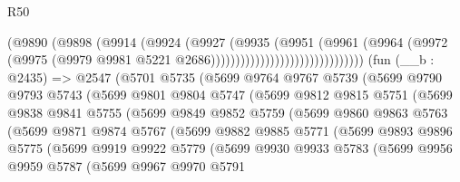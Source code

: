 \begin{lexlean}{R50}
\begin{coremodule}
                                          (@9890
                                            (@9898
                                              (@9914
                                                (@9924
                                                  (@9927
                                                    (@9935
                                                      (@9951
                                                        (@9961
                                                          (@9964
                                                            (@9972
                                                              (@9975
                                                                (@9979
                                                                  @9981
                                                                  @5221
                                                                  @2686)))))))))))))))))))))))))))))))
    (fun (__b : @2435) =>
    @2547
      (@5701
        @5735
        (@5699
          @9764
          @9767
          @5739
          (@5699
            @9790
            @9793
            @5743
            (@5699
              @9801
              @9804
              @5747
              (@5699
                @9812
                @9815
                @5751
                (@5699
                  @9838
                  @9841
                  @5755
                  (@5699
                    @9849
                    @9852
                    @5759
                    (@5699
                      @9860
                      @9863
                      @5763
                      (@5699
                        @9871
                        @9874
                        @5767
                        (@5699
                          @9882
                          @9885
                          @5771
                          (@5699
                            @9893
                            @9896
                            @5775
                            (@5699
                              @9919
                              @9922
                              @5779
                              (@5699
                                @9930
                                @9933
                                @5783
                                (@5699
                                  @9956
                                  @9959
                                  @5787
                                  (@5699
                                    @9967
                                    @9970
                                    @5791

\end{coremodule}
\end{lexlean}
